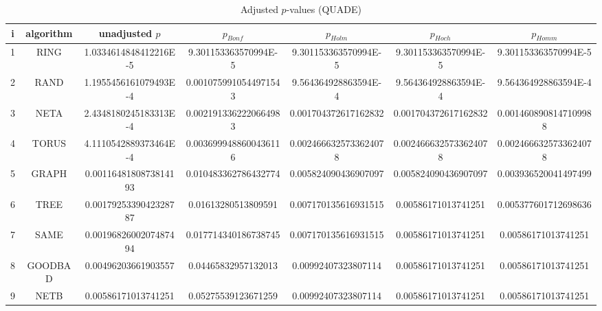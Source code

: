 \documentclass[a4paper,10pt]{article}
\begin{document}
\begin{landscape}
\begin{table}[!htp]
\centering\scriptsize
\caption{Adjusted $p$-values (QUADE)}
\begin{tabular}{ccccccc}
i&algorithm&unadjusted $p$&$p_{Bonf}$&$p_{Holm}$&$p_{Hoch}$&$p_{Homm}$\\
\hline
1& RING&1.0334614848412216E-5&9.301153363570994E-5&9.301153363570994E-5&9.301153363570994E-5&9.301153363570994E-5\\
2& RAND&1.1955456161079493E-4&0.0010759910544971543&9.564364928863594E-4&9.564364928863594E-4&9.564364928863594E-4\\
3& NETA&2.4348180245183313E-4&0.0021913362220664983&0.001704372617162832&0.001704372617162832&0.0014608908147109988\\
4& TORUS&4.1110542889373464E-4&0.0036999488600436116&0.0024666325733624078&0.0024666325733624078&0.0024666325733624078\\
5& GRAPH&0.0011648180873814193&0.010483362786432774&0.005824090436907097&0.005824090436907097&0.003936520041497499\\
6& TREE&0.0017925339042328787&0.01613280513809591&0.007170135616931515&0.00586171013741251&0.005377601712698636\\
7& SAME&0.0019682600207487494&0.017714340186738745&0.007170135616931515&0.00586171013741251&0.00586171013741251\\
8& GOODBAD&0.00496203661903557&0.04465832957132013&0.00992407323807114&0.00586171013741251&0.00586171013741251\\
9& NETB&0.00586171013741251&0.05275539123671259&0.00992407323807114&0.00586171013741251&0.00586171013741251\\
\hline
\end{tabular}
\end{table}


\end{landscape}
\end{document}
